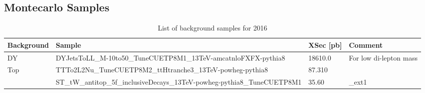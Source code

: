 \subsection{Montecarlo Samples}


\begin{sidewaystable}[htb]
\begin{center}
\caption{List of background samples for 2016}
\footnotesize
\begin{tabular}{|l|l|l|l|}
\hline
Background  & Sample & XSec [pb] & Comment \\ \hline
DY          & DYJetsToLL\_M-10to50\_TuneCUETP8M1\_13TeV-amcatnloFXFX-pythia8      & 18610.0 & For low di-lepton mass \\ %
Top         & TTTo2L2Nu\_TuneCUETP8M2\_ttHtranche3\_13TeV-powheg-pythia8          & 87.310 & \\ %
& ST\_tW\_antitop\_5f\_inclusiveDecays\_13TeV-powheg-pythia8\_TuneCUETP8M1        & 35.60 & \_ext1 \\ \hline %
\end{tabular}
\label{tab:BkgList1}
\end{center}
\end{sidewaystable}



